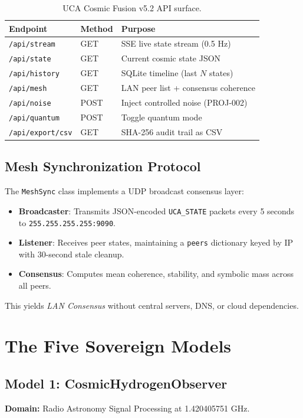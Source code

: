 \documentclass[12pt,a4paper]{article}
\theoremstyle{definition}
\begin{document}
\begin{table}[h]
\centering
\begin{tabular}{lll}
\toprule
\textbf{Endpoint} & \textbf{Method} & \textbf{Purpose} \\
\midrule
\texttt{/api/stream} & GET & SSE live state stream (0.5 Hz) \\
\texttt{/api/state} & GET & Current cosmic state JSON \\
\texttt{/api/history} & GET & SQLite timeline (last $N$ states) \\
\texttt{/api/mesh} & GET & LAN peer list + consensus coherence \\
\texttt{/api/noise} & POST & Inject controlled noise (PROJ-002) \\
\texttt{/api/quantum} & POST & Toggle quantum mode \\
\texttt{/api/export/csv} & GET & SHA-256 audit trail as CSV \\
\bottomrule
\end{tabular}
\caption{UCA Cosmic Fusion v5.2 API surface.}
\end{table}

\subsection{Mesh Synchronization Protocol}
The \texttt{MeshSync} class implements a UDP broadcast consensus layer:
\begin{itemize}
    \item \textbf{Broadcaster}: Transmits JSON-encoded \texttt{UCA\_STATE} packets every 5 seconds to \texttt{255.255.255.255:9090}.
    \item \textbf{Listener}: Receives peer states, maintaining a \texttt{peers} dictionary keyed by IP with 30-second stale cleanup.
    \item \textbf{Consensus}: Computes mean coherence, stability, and symbolic mass across all peers.
\end{itemize}
This yields \textit{LAN Consensus} without central servers, DNS, or cloud dependencies.

\section{The Five Sovereign Models}

\subsection{Model 1: CosmicHydrogenObserver}
\textbf{Domain:} Radio Astronomy Signal Processing at 1.420405751 GHz.
\end{document}
